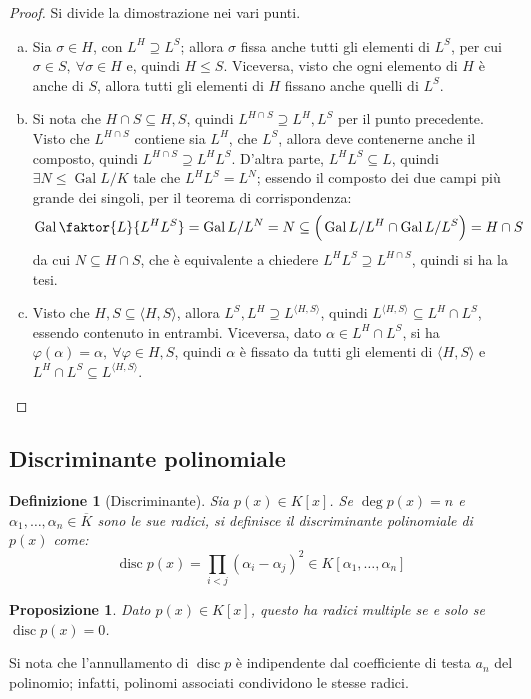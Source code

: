 \documentclass[12pt]{scrartcl}
\theoremstyle{style}
\newtheorem{definizione}{Definizione}[section]
\newtheorem{prop}{Proposizione}[section]
\numberwithin{equation}{subsection}
\begin{document}
\begin{proof}
	Si divide la dimostrazione nei vari punti.
	\begin{enumerate}[(a).]
		\item Sia $\sigma \in H$, con $L^H \supseteq L^S$; allora $\sigma $ fissa anche tutti gli elementi di $L^S$, per cui $\sigma \in S, \ \forall \sigma \in H$ e, quindi $H\le S$.
			Viceversa, visto che ogni elemento di $H$ \`e anche di $S$, allora tutti gli elementi di $H$ fissano anche quelli di $L^S$.
		\item Si nota che $H\cap S \subseteq H,S$, quindi $L^{H\cap S} \supseteq L^H,L^S$ per il punto precedente.
			Visto che $L^{H\cap S} $ contiene sia $L^H$, che $L^S$, allora deve contenerne anche il composto, quindi $L^{H\cap S} \supseteq L^{H} L^S$.
			D'altra parte, $L^H L^S \subseteq L$, quindi $\exists N\le \operatorname{Gal} L / K$ tale che $L^H L^S = L^N$; essendo il composto dei due campi pi\`u grande dei singoli, per il teorema di corrispondenza:
			\[
				\operatorname{Gal} \faktor{L}{L^H L^S}= \operatorname{Gal} L / L^N = N \subseteq \Big(\operatorname{Gal} L / L^H \cap \operatorname{Gal} L / L^S\Big) = H \cap S
			\] 
			da cui $N \subseteq H\cap S$, che \`e equivalente a chiedere $L^HL^S \supseteq L^{H\cap S} $, quindi si ha la tesi.
		\item Visto che $H , S \subseteq \langle H,S \rangle$, allora $L^S , L^H \supseteq L^{\langle H,S \rangle} $, quindi $L^{\langle H,S \rangle} \subseteq L^H \cap L^S$, essendo contenuto in entrambi.
			Viceversa, dato $\alpha \in L^H \cap L^S$, si ha $\varphi (\alpha ) = \alpha, \ \forall \varphi \in H, S$, quindi $\alpha $ \`e fissato da tutti gli elementi di $\langle H,S \rangle$ e $L^H \cap L^S \subseteq L^{\langle H,S \rangle} $.
	\end{enumerate}
\end{proof}
\subsection{Discriminante polinomiale}

\begin{definizione}
	[Discriminante]
	Sia $p(x) \in K[x]$.
	Se $\deg p(x)=n$ e $\alpha _1,\ldots,\alpha _n\in \overline{K}$ sono le sue radici, si definisce il \textit{discriminante polinomiale} di $p(x)$ come:
	\[
		\operatorname{disc} p(x) = \prod_{i<j} (\alpha _i-\alpha _j)^2 \in K[\alpha _1,\ldots,\alpha _n]
	\] 
\end{definizione}
\begin{prop}
	Dato $p(x) \in K[x]$, questo ha radici multiple se e solo se $\operatorname{disc} p(x) = 0$.
\end{prop}
\noindent Si nota che l'annullamento di $\operatorname{disc} p$ \`e indipendente dal coefficiente di testa $a_n$ del polinomio; infatti, polinomi associati condividono le stesse radici.
\end{document}
